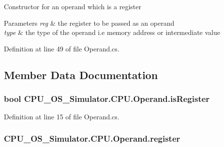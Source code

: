 Constructor for an operand which is a register 


\begin{DoxyParams}{Parameters}
{\em reg} & the register to be passed as an operand\\
\hline
{\em type} & the type of the operand i.\+e memory address or intermediate value\\
\hline
\end{DoxyParams}


Definition at line 49 of file Operand.\+cs.



\subsection{Member Data Documentation}
\hypertarget{class_c_p_u___o_s___simulator_1_1_c_p_u_1_1_operand_a16cc03d0d4c600b864d9c189529a473d}{}
\subsubsection[{is\+Register}]{\setlength{\rightskip}{0pt plus 5cm}bool C\+P\+U\+\_\+\+O\+S\+\_\+\+Simulator.\+C\+P\+U.\+Operand.\+is\+Register\hspace{0.3cm}{\ttfamily [private]}}\label{class_c_p_u___o_s___simulator_1_1_c_p_u_1_1_operand_a16cc03d0d4c600b864d9c189529a473d}


Definition at line 15 of file Operand.\+cs.

\hypertarget{class_c_p_u___o_s___simulator_1_1_c_p_u_1_1_operand_a55d446765a50844fcbbc56b757b1b679}{}
\subsubsection[{register}]{ C\+P\+U\+\_\+\+O\+S\+\_\+\+Simulator.\+C\+P\+U.\+Operand.\+register\hspace{0.3cm}{\ttfamily [private]}}\label{class_c_p_u___o_s___simulator_1_1_c_p_u_1_1_operand_a55d446765a50844fcbbc56b757b1b679}


